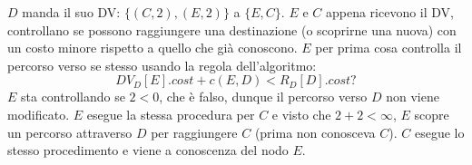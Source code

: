 \documentclass[10pt]{article}
\begin{document}
	\newline \newline
	$D$ manda il suo DV: $\{(C,2),(E,2)\}$ a $\{E,C\}$.
	\newline
	$E$ e $C$ appena ricevono il DV, controllano se possono raggiungere una destinazione (o scoprirne una nuova) con un costo minore rispetto a quello che già conoscono.
	\newline
	$E$ per prima cosa controlla il percorso verso se stesso usando la regola dell'algoritmo: $$DV_D[E].cost + c(E,D) < R_D[D].cost?$$
	$E$ sta controllando se $2<0$, che è falso, dunque il percorso verso $D$ non viene modificato.
	\newline
	$E$ esegue la stessa procedura per $C$ e visto che $2+2 < \infty$, $E$ scopre un percorso attraverso $D$ per raggiungere $C$ (prima non conosceva $C$).
	\newline
	$C$ esegue lo stesso procedimento e viene a conoscenza del nodo $E$.
\end{document}
